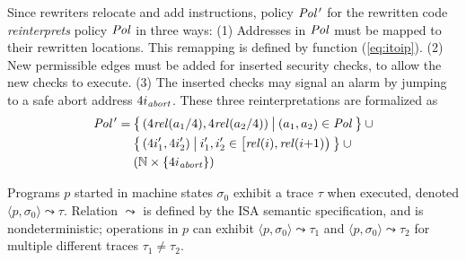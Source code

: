 Since rewriters relocate and add instructions, policy $\mathit{Pol}\kern1pt'$ for the rewritten code \emph{reinterprets} policy $\mathit{Pol}$ in three ways:
(1) Addresses in $\mathit{Pol}$ must be mapped to their rewritten locations.
This remapping is defined by function \itoip (\autoref{eq:itoip}).
(2) New permissible edges must be added for inserted security checks, to allow the new checks to execute.
(3) The inserted checks may signal an alarm by jumping to a safe abort address $4i_\mathit{abort}$.
These three reinterpretations are formalized as
\begin{equation}
\begin{aligned}
  \mathit{Pol}\kern1pt' =\:& \big\{\kern1.5pt(4\mathit{rel}(a_1/4),4\mathit{rel}(a_2/4))\:\big|\:(a_1,a_2)\in\mathit{Pol}\kern2pt\big\}\:\cup \\
                  &\big\{\kern1.5pt(4i'_1,4i'_2)\:\big|\:i_1',i_2'\in\big[\kern-.2pt\mathit{rel}(i),\mathit{rel}(i{+}1)\kern.2pt\big)\kern2pt\big\}\:\cup \\
                  &(\mathbb{N}\times\{4i_\mathit{abort}\})
\end{aligned}
\end{equation}


Programs $p$ started in machine states $\sigma_0$ exhibit a trace $\tau$ when executed, denoted $\langle p,\sigma_0\rangle\leadsto\tau$.
Relation $\leadsto$ is defined by the ISA semantic specification, and is nondeterministic;
\unpredictable{} operations in $p$ can exhibit $\langle p,\sigma_0\rangle\leadsto\tau_1$ and $\langle p,\sigma_0\rangle\leadsto\tau_2$ for multiple different traces $\tau_1\ne\tau_2$.

